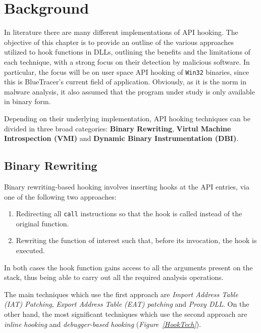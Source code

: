 
\chapter{Background} \label{background}

In literature there are many different implementations of API hooking. The objective of this chapter is to provide an outline of the various approaches utilized to hook functions in DLLs, outlining the benefits and the limitations of each technique, with a strong focus on their detection by malicious software. In particular, the focus will be on user space API hooking of \texttt{Win32} binaries, since this is BlueTracer's current field of application. Obviously, as it is the norm in malware analysis, it also assumed that the program under study is only available in binary form.

Depending on their underlying implementation, API hooking techniques can be divided in three broad categories: \textbf{Binary Rewriting}, \textbf{Virtul Machine Introspection (VMI)} and \textbf{Dynamic Binary Instrumentation (DBI)}.   

\section{Binary Rewriting}

Binary rewriting-based hooking involves inserting hooks at the API entries, via one of the following two approaches:
\begin{enumerate}
\item Redirecting all \texttt{call} instructions so that the hook is called instead of the original function.
\item Rewriting the function of interest such that, before its invocation, the hook is executed. 
\end{enumerate} 

In both cases the hook function gains access to all the arguments present on the stack, thus being able to carry out all the required analysis operations.

The main techniques which use the first approach are \textit{Import Address Table (IAT) Patching}, \textit{Export Address Table (EAT) patching} and \textit{Proxy DLL}. On the other hand, the most significant techniques which use the second approach are \textit{inline hooking} and \textit{debugger-based hooking} (\textit{Figure~\ref{HookTech}}).



